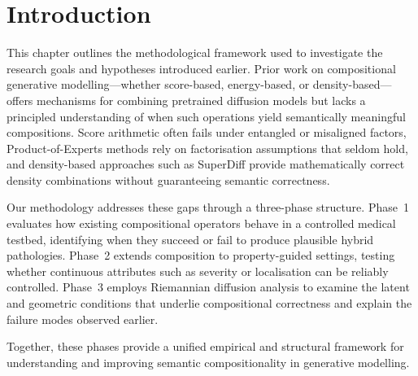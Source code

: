 \section{Introduction}
\label{sec:research_method_introduction}

This chapter outlines the methodological framework used to investigate the
research goals and hypotheses introduced earlier. Prior work on compositional
generative modelling—whether score-based, energy-based, or density-based—offers
mechanisms for combining pretrained diffusion models but lacks a principled
understanding of when such operations yield semantically meaningful
compositions. Score arithmetic often fails under entangled or misaligned
factors, Product-of-Experts methods rely on factorisation assumptions that seldom
hold, and density-based approaches such as SuperDiff provide mathematically
correct density combinations without guaranteeing semantic correctness.

Our methodology addresses these gaps through a three-phase structure. Phase~1
evaluates how existing compositional operators behave in a controlled medical
testbed, identifying when they succeed or fail to produce plausible hybrid
pathologies. Phase~2 extends composition to property-guided settings, testing
whether continuous attributes such as severity or localisation can be reliably
controlled. Phase~3 employs Riemannian diffusion analysis to examine the latent
and geometric conditions that underlie compositional correctness and explain the
failure modes observed earlier.

Together, these phases provide a unified empirical and structural framework for
understanding and improving semantic compositionality in generative modelling.
